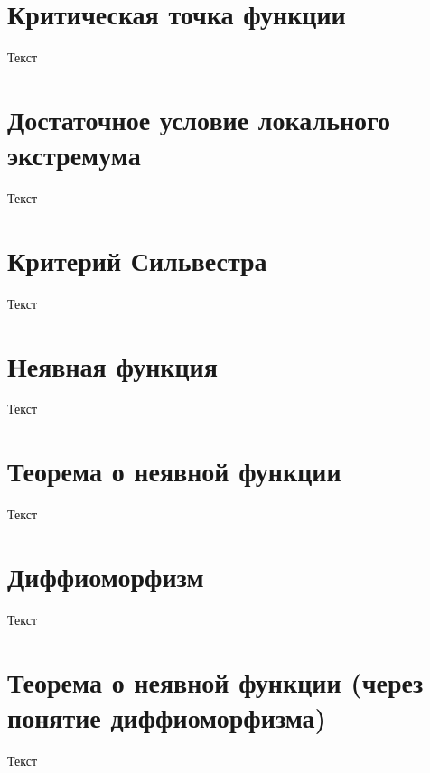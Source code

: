 \documentclass{report}
\theoremstyle{definition}
\begin{document}
\section{Критическая точка функции}
Текст

\section{Достаточное условие локального экстремума}
Текст

\section{Критерий Сильвестра}
Текст

\section{Неявная функция}
Текст

\section{Теорема о неявной функции}
Текст

\section{Диффиоморфизм}
Текст

\section{Теорема о неявной функции (через понятие диффиоморфизма)}
Текст
\end{document}
